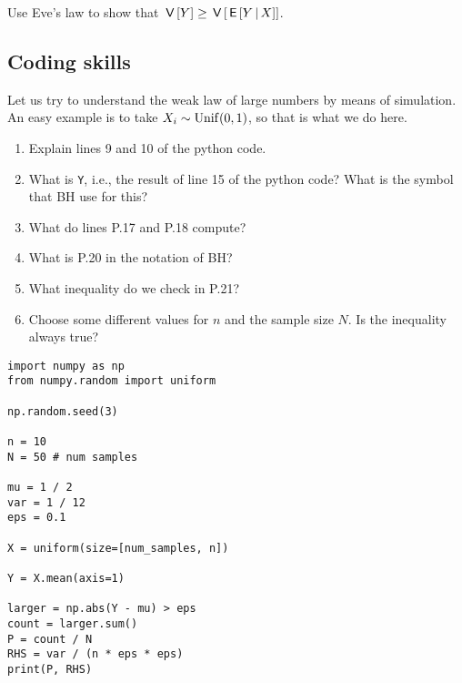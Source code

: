 \documentclass[assignments]{subfiles}
\begin{document}
\begin{exercise}
Use Eve's law to show that $\,\mathsf{V}\left[Y\right] \geq \,\mathsf{V}\left[\,\mathsf{E}\left[Y\,\middle|\, X\right]\right]$.
\end{exercise}

\subsection{Coding skills}

\begin{exercise}
Let us try to understand the weak law of large numbers by means of simulation. An easy example is to take $X_{i}\sim\mathrm{Unif}(0,1)$, so that is what we do here.

\begin{enumerate}
\item Explain lines 9 and 10 of the python code.
\item What is \texttt{Y}, i.e., the result of line 15 of the python code? What is the symbol that BH use for this?
\item What do lines P.17 and P.18 compute?
\item What is P.20 in the notation of BH?
\item What inequality do we check in P.21?
\item Choose some different values for $n$ and the sample size $N$. Is the inequality always true?
\end{enumerate}

\begin{verbatim}
import numpy as np
from numpy.random import uniform

np.random.seed(3)

n = 10
N = 50 # num samples

mu = 1 / 2
var = 1 / 12
eps = 0.1

X = uniform(size=[num_samples, n])

Y = X.mean(axis=1)

larger = np.abs(Y - mu) > eps
count = larger.sum()
P = count / N
RHS = var / (n * eps * eps)
print(P, RHS)
\end{verbatim}

\end{exercise}
\end{document}
